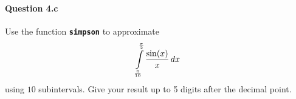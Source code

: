 

\paragraph{Question 4.c} Use the function \textbf{\lstinline|simpson|} to approximate
\[ \displaystyle\int\limits_{\frac{\pi}{10}}^{\frac{\pi}{2}} \dfrac{\sin(x)}{x}\,dx\]
using $10$ subintervals. Give your result up to 5 digits after the decimal point.

